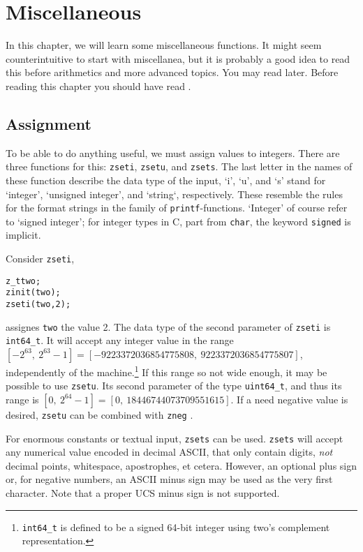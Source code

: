\chapter{Miscellaneous}
\label{chap:Miscellaneous}

In this chapter, we will learn some miscellaneous
functions. It might seem counterintuitive to start
with miscellanea, but it is probably a good idea
to read this before arithmetics and more advanced
topics. You may read 
later. Before reading this chapter you should
have read .


\vspace{1cm}
\minitoc


\newpage
\section{Assignment}
\label{sec:Assignment}

To be able to do anything useful, we must assign
values to integers. There are three functions for
this: {\tt zseti}, {\tt zsetu}, and {\tt zsets}.
The last letter in the names of these function
describe the data type of the input, `i', `u',
and `s' stand for `integer', `unsigned integer',
and `string`, respectively. These resemble the
rules for the format strings in the family of
{\tt printf}-functions. `Integer' of course refer
to `signed integer'; for integer types in C,
part from {\tt char}, the keyword {\tt signed}
is implicit.

Consider {\tt zseti},

\begin{alltt}
   \textcolor{c}{z_t two;}
   \textcolor{c}{zinit(two);}
   zseti(two, 2);
\end{alltt}

\noindent
assignes {\tt two} the value 2. The data type of
the second parameter of {\tt zseti} is {\tt int64\_t}.
It will accept any integer value in the range
$[-2^{63},~2^{63} - 1] = [-9223372036854775808,~9223372036854775807]$,
independently of the machine.\footnote{{\tt int64\_t}
is defined to be a signed 64-bit integer using two's
complement representation.} If this range so not wide
enough, it may be possible to use {\tt zsetu}. Its
second parameter of the type {\tt uint64\_t}, and thus
its range is $[0,~2^{64} - 1] = [0,~18446744073709551615]$.
If a need negative value is desired, {\tt zsetu} can be
combined with {\tt zneg} .

For enormous constants or textual input, {\tt zsets}
can be used. {\tt zsets} will accept any numerical
value encoded in decimal ASCII, that only contain
digits, \emph{not} decimal points, whitespace,
apostrophes, et cetera. However, an optional plus
sign or, for negative numbers, an ASCII minus sign
may be used as the very first character. Note that
a proper UCS minus sign is not supported.

